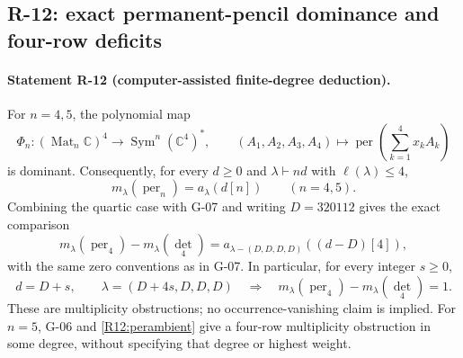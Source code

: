 \subsection{R-12: exact permanent-pencil dominance and four-row deficits}

\paragraph{Statement R-12 (computer-assisted finite-degree deduction).}
For $n=4,5$, the polynomial map
\[
 \Phi_n:(\operatorname{Mat}_n\mathbb C)^4
 \longrightarrow\operatorname{Sym}^n(\mathbb C^4)^*,
 \qquad(A_1,A_2,A_3,A_4)\longmapsto
 \operatorname{per}\!\left(\sum_{k=1}^4x_kA_k\right)
\]
is dominant. Consequently, for every $d\geq0$ and
$\lambda\vdash nd$ with $\ell(\lambda)\leq4$,
\begin{equation}\label{R12:perambient}
 m_\lambda(\operatorname{per}_n)=a_\lambda(d[n])
 \qquad(n=4,5).
\end{equation}
Combining the quartic case with G-07 and writing $D=320112$ gives
the exact comparison
\begin{equation}\label{R12:deficit}
 m_\lambda(\operatorname{per}_4)-m_\lambda(\det_4)
 =a_{\lambda-(D,D,D,D)}((d-D)[4]),
\end{equation}
with the same zero conventions as in G-07.
In particular, for every integer $s\geq0$,
\begin{equation}\label{R12:gapone}
 d=D+s,\qquad \lambda=(D+4s,D,D,D)
 \quad\Longrightarrow\quad
 m_\lambda(\operatorname{per}_4)-m_\lambda(\det_4)=1.
\end{equation}
These are multiplicity obstructions; no occurrence-vanishing
claim is implied. For $n=5$, G-06 and \eqref{R12:perambient}
give a four-row multiplicity obstruction in some degree, without
specifying that degree or highest weight.

